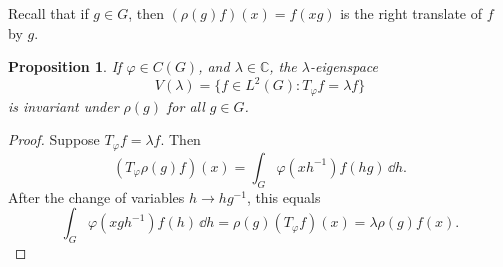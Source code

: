 \documentclass[12pt,reqno]{book}%
\newtheorem{proposition}{Proposition}[chapter]
\theoremstyle{definition}
\theoremstyle{remark}
\theoremstyle{theorem}
\theoremstyle{remark}
\renewcommand{\d}{\dd}
\begin{document}
Recall that if $g \in G$, then $(\rho(g)f)(x) = f(xg)$ is the right translate of $f$ by $g$.

\begin{proposition}\label{prop4.3}%
    If $\varphi \in C(G)$, and $\lambda \in \mathbb{C}$, the $\lambda$-eigenspace
    \[
        V(\lambda) = \{f \in L^2(G) : T_\varphi f = \lambda f\}
    \]
    is invariant under $\rho(g)$ for all $g \in G$.
\end{proposition}%
\begin{proof}%
    Suppose $T_\varphi f = \lambda f$.
    Then
    \[
        (T_\varphi \rho(g) f)(x) = \int_{G} \varphi(xh^{-1}) f(hg) \, \d h.
    \]
    After the change of variables $h \to hg^{-1}$, this equals
    \[
        \int_{G} \varphi(xgh^{-1}) f(h) \, \d h = \rho(g)(T_\varphi f)(x) = \lambda\rho(g) f(x).
    \]
\end{proof}%
\end{document}
